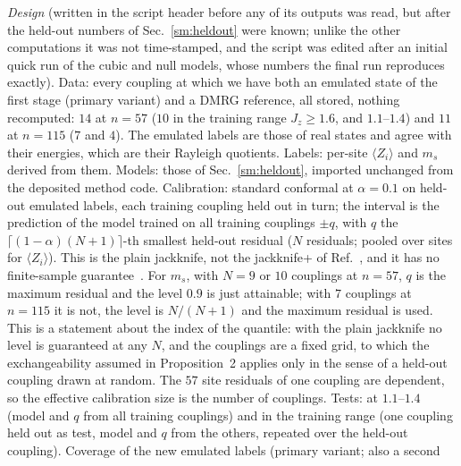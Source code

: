 \documentclass[aps,prx,onecolumn,10pt,nofootinbib,longbibliography,floatfix]{revtex4-2}
\theoremstyle{remark}
\newcommand{\Jz}{J_z}
\newcommand{\ms}{m_s}
\begin{document}
\emph{Design} (written in the script header before any of its outputs was read, but after the held-out numbers of
Sec.~\ref{sm:heldout} were known; unlike the other computations it was not time-stamped, and the script was edited
after an initial quick run of the cubic and null models, whose numbers the final run reproduces exactly). Data: every coupling at which we have both an emulated state of the first stage (primary
variant) and a DMRG reference, all stored, nothing recomputed: $14$ at $n=57$ ($10$ in the training range $\Jz\ge1.6$, and $1.1$--$1.4$) and $11$ at %
$n=115$ ($7$ and $4$). The emulated labels are those of real states and agree with their energies, which are their %
Rayleigh quotients. Labels: per-site $\langle Z_i\rangle$ and $\ms$ derived from them. Models: those of
Sec.~\ref{sm:heldout}, imported unchanged from the deposited method code. Calibration: standard conformal at
$\alpha=0.1$ on held-out emulated labels, each training coupling held out in turn; the interval is the prediction of %
the model trained on all training couplings $\pm q$, with $q$ the $\lceil(1-\alpha)(N+1)\rceil$-th smallest held-out
residual ($N$ residuals; pooled over sites for $\langle Z_i\rangle$). This is the plain jackknife, not the
jackknife+ of Ref.~\cite{barber2019}, and it has no finite-sample guarantee~\cite{barber2019}. For $\ms$, with $N=9$ or $10$ couplings at $n=57$, %
$q$ is the maximum residual and the level $0.9$ is just attainable; with $7$ couplings at $n=115$ it is not, the %
level is $N/(N+1)$ and the maximum residual is used. This is a statement about the index of the quantile: with the
plain jackknife no level is guaranteed at any $N$, and the couplings are a fixed grid, to which the exchangeability
assumed in Proposition~2 applies only in the sense of a held-out coupling drawn at random. The $57$ site residuals of one coupling are dependent, so the %
effective calibration size is the number of couplings. Tests: at $1.1$--$1.4$ (model and $q$ %
from all training couplings) and in the training range (one coupling held out as test, model and $q$ from the
others, repeated over the held-out coupling). Coverage of the new emulated labels (primary variant; also a second
\end{document}
